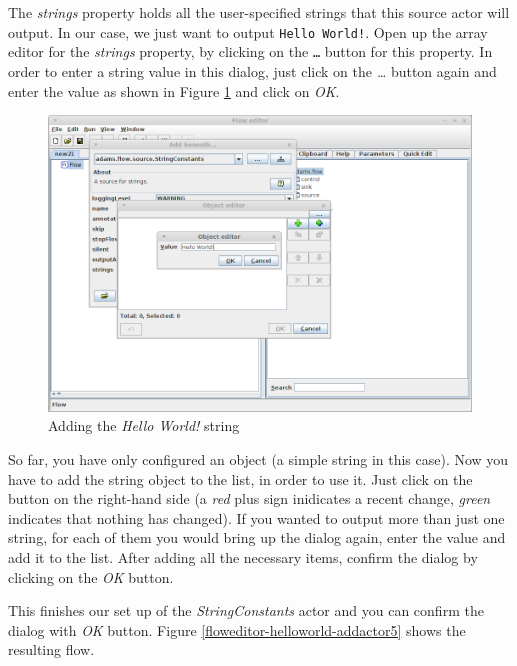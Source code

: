 The \textit{strings} property holds all the user-specified strings that this
source actor will output. In our case, we just want to output
\texttt{Hello World!}. Open up the array editor for the \textit{strings}
property, by clicking on the \texttt{\ldots} button for this property.
In order to enter a string value in this dialog, just click on the
\textit{\ldots} button again and enter the value as shown in Figure
\ref{floweditor-helloworld-addactor4} and click on \textit{OK}.

\begin{figure}[htb]
  \centering
  \includegraphics[width=12.0cm]{images/floweditor-helloworld-addactor4.png}
  \caption{Adding the \textit{Hello World!} string}
  \label{floweditor-helloworld-addactor4}
\end{figure}

So far, you have only configured an object (a simple string in this case). Now
you have to add the string object to the list, in order to use it. Just click on
the  button on the right-hand side (a
\textit{red} plus sign inidicates a recent change, \textit{green} indicates
that nothing has changed). If you wanted to output more than just one string,
for each of them you would bring up the dialog again, enter the value and add
it to the list. After adding all the necessary items, confirm the dialog by
clicking on the \textit{OK} button.

This finishes our set up of the \textit{StringConstants} actor and you can
confirm the dialog with \textit{OK} button. Figure
\ref{floweditor-helloworld-addactor5} shows the resulting flow.

